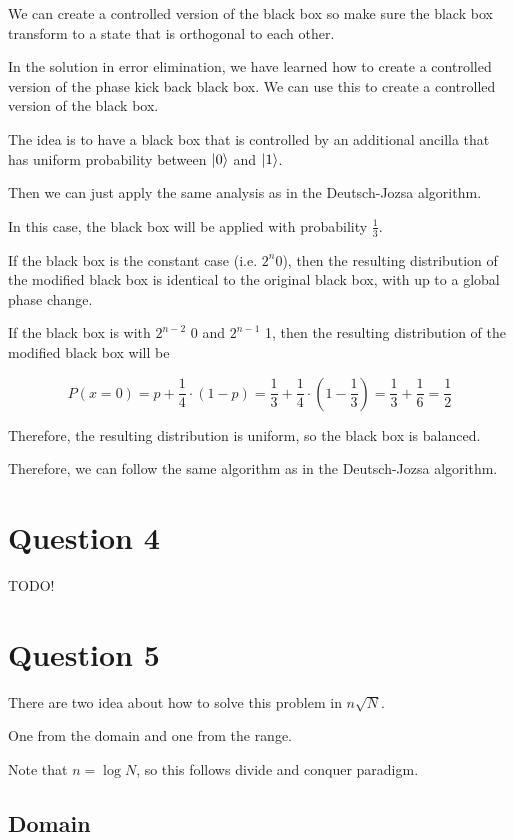 \documentclass{article}
\theoremstyle{definition}
\DeclarePairedDelimiter\ket{\lvert}{\rangle}
\begin{document}
We can create a controlled version of the black box so make sure the black box transform
to a state that is orthogonal to each other.

In the solution in error elimination, we have learned how to create a
controlled version of the phase kick back black box. We can use this
to create a controlled version of the black box.

The idea is to have a black box that is controlled by an additional ancilla that has
uniform probability between $\ket{0}$ and $\ket{1}$.

Then we can just apply the same analysis as in the Deutsch-Jozsa algorithm.

In this case, the black box will be applied with probability $\frac{1}{3}$.

If the black box is the constant case (i.e. $2^n$0), then the resulting distribution of the modified black box is
identical to the original black box, with up to a global phase change.

If the black box is with $2^{n-2}$ 0 and $2^{n-1}$ 1, then the resulting distribution
of the modified black box will be

\[
  P(x=0) = p + \frac{1}{4} \cdot (1-p) = \frac{1}{3} + \frac{1}{4} \cdot (1-\frac{1}{3}) = \frac{1}{3} + \frac{1}{6} =\frac{1}{2}
\]

Therefore, the resulting distribution is uniform, so the black box is balanced.

Therefore, we can follow the same algorithm as in the Deutsch-Jozsa algorithm.

\pagebreak

\section{Question 4 }

TODO!

\pagebreak

\section{Question 5}

There are two idea about how to solve this problem in $n\sqrt{N}$.

One from the domain and one from the range.

Note that $n=\log N$, so this follows divide and conquer paradigm.

\subsection{Domain}
\end{document}
